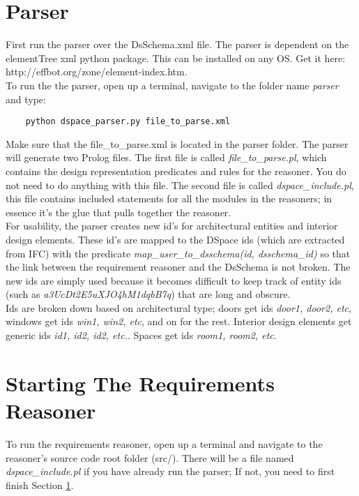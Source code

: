 \documentclass[12pt]{article}
\begin{document}
\maketitle

\section{Parser}\label{parser}
First run the parser over the DsSchema.xml file. The parser is dependent on the elementTree xml python package. This can be installed on any OS. Get it here: http://effbot.org/zone/element-index.htm. \\

\noindent To run the the parser, open up a terminal, navigate to the folder name \emph{parser} and type:
\begin{verbatim}
    python dspace_parser.py file_to_parse.xml
\end{verbatim} Make sure that the file_to_parse.xml is located in the parser folder. The parser will generate two Prolog files. The first file is called \emph{file_to_parse.pl}, which contains the design representation predicates and rules for the reasoner. You do not need to do anything with this file. The second file is called \emph{dspace_include.pl}, this file contains included statements for all the modules in the reasoners; in essence it's the glue that pulls together the reasoner.\\

\noindent For usability, the parser creates new id's for architectural entities and interior design elements. These id's are mapped to the DSpace ids (which are extracted from IFC) with the predicate \emph{map_user_to_dsschema(id, dsschema_id)} so that the link between the requirement reasoner and the DsSchema is not broken. The new ids are simply used because it becomes difficult to keep track of entity ids (such as \emph{a3UcDt2E5uXJO4hM1dqbB7q}) that are long and obscure. \\

\noindent Ids are broken down based on architectural type; doors get ids \emph{door1, door2, etc}, windows get ids \emph{win1, win2, etc}, and on for the rest. Interior design elements get generic ids \emph{id1, id2, id2, etc.}. Spaces get ids \emph{room1, room2, etc}. 


\section{Starting The Requirements Reasoner}
To run the requirements reasoner, open up a terminal and navigate to the reasoner's source code root folder (src/). There will be a file named \emph{dspace_include.pl} if you have already run the parser; If not, you need to first finish Section \ref{parser}. 
\end{document}

